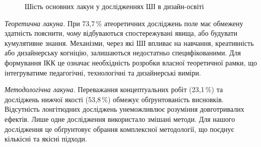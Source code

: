 \begin{figure}[htbp]
\centering
{}
\caption{Шість основних лакун у дослідженнях ШІ в дизайн-освіті}
\label{fig:1.2_gaps}
\end{figure}

\textit{Теоретична лакуна.} При 73,7\,\% атеоретичних досліджень поле має обмежену здатність пояснити, \textit{чому} відбуваються спостережувані явища, або будувати кумулятивне знання. Механізми, через які ШІ впливає на навчання, креативність або дизайнерську когніцію, залишаються недостатньо специфікованими. Для формування ІКК це означає необхідність розробки власної теоретичної рамки, що інтегруватиме педагогічні, технологічні та дизайнерські виміри.

\textit{Методологічна лакуна.} Переважання концептуальних робіт (23,1\,\%) та досліджень нижчої якості (53,8\,\%) обмежує обґрунтованість висновків. Відсутність лонгітюдних досліджень унеможливлює розуміння довготривалих ефектів. Лише одне дослідження використало змішані методи. Для нашого дослідження це обґрунтовує обрання комплексної методології, що поєднує кількісні та якісні підходи.

